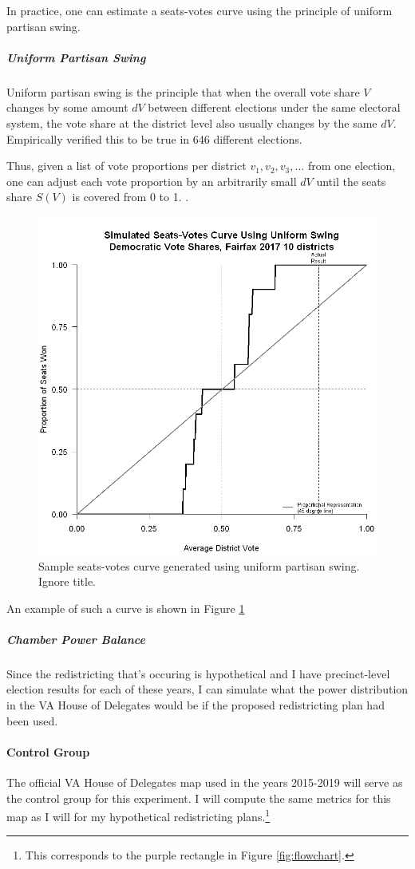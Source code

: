 In practice, one can estimate a seats-votes curve using the principle of uniform partisan swing.

\subparagraph{Uniform Partisan Swing}

Uniform partisan swing is the principle that when the overall vote share $V$ changes by some amount $dV$ between different elections under the same electoral system, the vote share at the district level also usually changes by the same $dV$. \textcite{katz2020} Empirically verified this to be true in 646 different elections. 

Thus, given a list of vote proportions per district ${v_1, v_2, v_3, ...}$ from one election, one can adjust each vote proportion by an arbitrarily small $dV$ until the seats share $S(V)$ is covered from 0 to 1. \parencite{katz2020}.

\begin{figure}
    \includegraphics[width=0.5\linewidth]{img/seatsvotesups.png}
    \caption{Sample seats-votes curve generated using uniform partisan swing. Ignore title. \parencite[175]{katz2020}}
    \label{fig:seatsvotesups1}
\end{figure}

An example of such a curve is shown in Figure \ref{fig:seatsvotesups1}

\subparagraph{Chamber Power Balance}

Since the redistricting that's occuring is hypothetical and I have precinct-level election results for each of these years, I can simulate what the power distribution in the VA House of Delegates would be if the proposed redistricting plan had been used. 

\paragraph{Control Group}

The official VA House of Delegates map used in the years 2015-2019 will serve as the control group for this experiment. I will compute the same metrics for this map as I will for my hypothetical redistricting plans.\footnote{This corresponds to the purple rectangle in Figure \ref{fig:flowchart}.}

